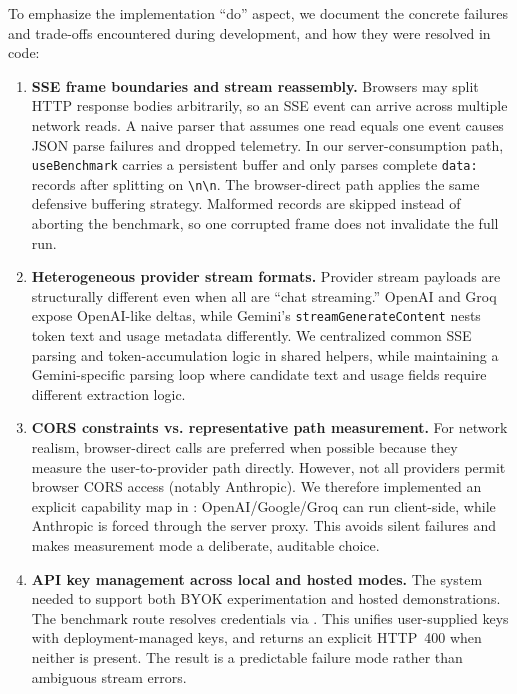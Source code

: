 \documentclass[11pt, a4paper]{article}
\begin{document}
To emphasize the implementation ``do'' aspect, we document the concrete failures and trade-offs encountered during development, and how they were resolved in code:

\begin{enumerate}
  \item \textbf{SSE frame boundaries and stream reassembly.} Browsers may split HTTP response bodies arbitrarily, so an SSE event can arrive across multiple network reads. A naive parser that assumes one read equals one event causes JSON parse failures and dropped telemetry. In our server-consumption path, \texttt{useBenchmark} carries a persistent buffer and only parses complete \texttt{data:} records after splitting on \texttt{\textbackslash n\textbackslash n}. The browser-direct path applies the same defensive buffering strategy. Malformed records are skipped instead of aborting the benchmark, so one corrupted frame does not invalidate the full run.

  \item \textbf{Heterogeneous provider stream formats.} Provider stream payloads are structurally different even when all are ``chat streaming.'' OpenAI and Groq expose OpenAI-like deltas, while Gemini's \texttt{streamGenerateContent} nests token text and usage metadata differently. We centralized common SSE parsing and token-accumulation logic in shared helpers, while maintaining a Gemini-specific parsing loop where candidate text and usage fields require different extraction logic.

  \item \textbf{CORS constraints vs. representative path measurement.} For network realism, browser-direct calls are preferred when possible because they measure the user-to-provider path directly. However, not all providers permit browser CORS access (notably Anthropic). We therefore implemented an explicit capability map in : OpenAI/Google/Groq can run client-side, while Anthropic is forced through the server proxy. This avoids silent failures and makes measurement mode a deliberate, auditable choice.

  \item \textbf{API key management across local and hosted modes.} The system needed to support both BYOK experimentation and hosted demonstrations. The benchmark route resolves credentials via . This unifies user-supplied keys with deployment-managed keys, and returns an explicit HTTP~400 when neither is present. The result is a predictable failure mode rather than ambiguous stream errors.


\end{enumerate}
\end{document}
